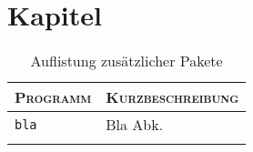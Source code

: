 \section{Kapitel}\label{sec:kapitel}


\begin{longtable}{p{}|p{}}
	\toprule
	{\large\textsc{Programm}} & {\large\textsc{Kurzbeschreibung}} \\
	\midrule[1pt]
	\texttt{bla\cite{example}} & Bla \ac{Abk.} \\
	\bottomrule
	\caption{Auflistung zusätzlicher Pakete}
	\label{tab:software}
\end{longtable}
